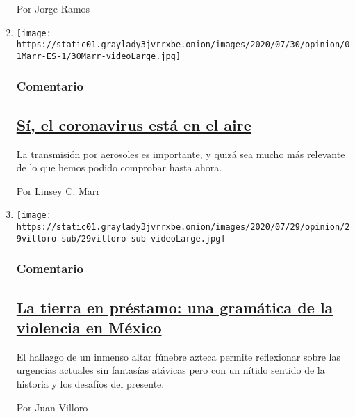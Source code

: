 \begin{enumerate}
  Por Jorge Ramos
\item
  \texttt{[image: https://static01.graylady3jvrrxbe.onion/images/2020/07/30/opinion/01Marr-ES-1/30Marr-videoLarge.jpg]}

  \hypertarget{comentario-2}{%
  \subsubsection{Comentario}\label{comentario-2}}

  \hypertarget{suxed-el-coronavirus-estuxe1-en-el-aire}{%
  \subsection{\texorpdfstring{\href{/es/2020/08/01/espanol/opinion/coronavirus-aire.html}{Sí,
  el coronavirus está en el
  aire}}{Sí, el coronavirus está en el aire}}\label{suxed-el-coronavirus-estuxe1-en-el-aire}}

  La transmisión por aerosoles es importante, y quizá sea mucho más
  relevante de lo que hemos podido comprobar hasta ahora.

  Por Linsey C. Marr
\item
  \texttt{[image: https://static01.graylady3jvrrxbe.onion/images/2020/07/29/opinion/29villoro-sub/29villoro-sub-videoLarge.jpg]}

  \hypertarget{comentario-3}{%
  \subsubsection{Comentario}\label{comentario-3}}

  \hypertarget{la-tierra-en-pruxe9stamo-una-gramuxe1tica-de-la-violencia-en-muxe9xico}{%
  \subsection{\texorpdfstring{\href{/es/2020/07/30/espanol/opinion/aztecas-violencia-narco-amlo.html}{La
  tierra en préstamo: una gramática de la violencia en
  México}}{La tierra en préstamo: una gramática de la violencia en México}}\label{la-tierra-en-pruxe9stamo-una-gramuxe1tica-de-la-violencia-en-muxe9xico}}

  El hallazgo de un inmenso altar fúnebre azteca permite reflexionar
  sobre las urgencias actuales sin fantasías atávicas pero con un nítido
  sentido de la historia y los desafíos del presente.

  Por Juan Villoro
\end{enumerate}

